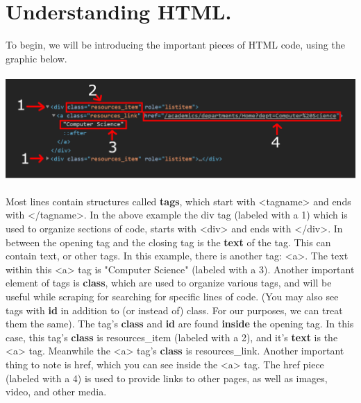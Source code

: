 \documentclass[11pt, letterpaper, onecolumn, oneside, final]{article}
\begin{document}
\section{Understanding HTML.} To begin, we will be introducing the important pieces of HTML code, using the graphic below.\\\\
\includegraphics[scale = .5]{tags_final}
\\\\
    Most lines contain structures called \textbf{tags}, which start with {\consolas <tagname>} and ends with {\consolas </tagname>}. In the above example the {\consolas div} tag (labeled with a 1) which is used to organize sections of code, starts with {\consolas <div>} and ends with {\consolas </div>}. In between the opening tag and the closing tag is the \textbf{text} of the tag. This can contain text, or other tags. In this example, there is another tag: {\consolas <a>}. The text within this {\consolas <a>} tag is {\consolas "Computer Science"} (labeled with a 3). Another important element of tags is \textbf{class}, which are used to organize various tags, and will be useful while scraping for searching for specific lines of code. (You may also see tags with \textbf{id} in addition to (or instead of) class. For our purposes, we can treat them the same). The tag's \textbf{class} and \textbf{id} are found \textbf{inside} the opening tag. In this case, this tag's \textbf{class} is {\consolas resources\_item} (labeled with a 2), and it's \textbf{text} is the {\consolas <a>} tag. Meanwhile the {\consolas <a>} tag's \textbf{class} is {\consolas resources\_link}. Another important thing to note is {\consolas href}, which you can see inside the {\consolas <a>} tag. The {\consolas href} piece (labeled with a 4) is used to provide links to other pages, as well as images, video, and other media. 
\end{document}
